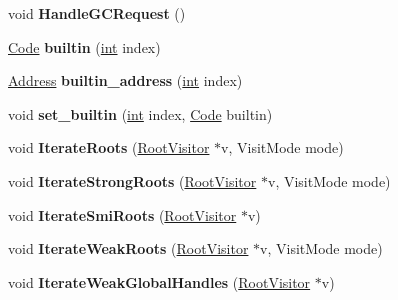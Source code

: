 \begin{DoxyCompactItemize}
void {\bfseries Handle\+G\+C\+Request} ()
\item 
\mbox{\label{classv8_1_1internal_1_1Heap_a3164020f77bdc8f56577bdccc19cf290}} 
\mbox{\hyperlink{classv8_1_1internal_1_1Code}{Code}} {\bfseries builtin} (\mbox{\hyperlink{classint}{int}} index)
\item 
\mbox{\label{classv8_1_1internal_1_1Heap_af899be456bb8c2a296ca880daed45613}} 
\mbox{\hyperlink{classuintptr__t}{Address}} {\bfseries builtin\+\_\+address} (\mbox{\hyperlink{classint}{int}} index)
\item 
\mbox{\label{classv8_1_1internal_1_1Heap_ab7fe0ff7d984fbdf6926e436f858cff0}} 
void {\bfseries set\+\_\+builtin} (\mbox{\hyperlink{classint}{int}} index, \mbox{\hyperlink{classv8_1_1internal_1_1Code}{Code}} builtin)
\item 
\mbox{\label{classv8_1_1internal_1_1Heap_aedea6de613a6a881f4eb8814e883aa90}} 
void {\bfseries Iterate\+Roots} (\mbox{\hyperlink{classv8_1_1internal_1_1RootVisitor}{Root\+Visitor}} $\ast$v, Visit\+Mode mode)
\item 
\mbox{\label{classv8_1_1internal_1_1Heap_a07cc9206480d6994e41902769e78f619}} 
void {\bfseries Iterate\+Strong\+Roots} (\mbox{\hyperlink{classv8_1_1internal_1_1RootVisitor}{Root\+Visitor}} $\ast$v, Visit\+Mode mode)
\item 
\mbox{\label{classv8_1_1internal_1_1Heap_a7cf83754b01dbf26820590c36b311d2a}} 
void {\bfseries Iterate\+Smi\+Roots} (\mbox{\hyperlink{classv8_1_1internal_1_1RootVisitor}{Root\+Visitor}} $\ast$v)
\item 
\mbox{\label{classv8_1_1internal_1_1Heap_a1a3b617b35b3f5db6632b60827c002f2}} 
void {\bfseries Iterate\+Weak\+Roots} (\mbox{\hyperlink{classv8_1_1internal_1_1RootVisitor}{Root\+Visitor}} $\ast$v, Visit\+Mode mode)
\item 
\mbox{\label{classv8_1_1internal_1_1Heap_aab3b04af5baef6bb6f9dec5c5e851fd5}} 
void {\bfseries Iterate\+Weak\+Global\+Handles} (\mbox{\hyperlink{classv8_1_1internal_1_1RootVisitor}{Root\+Visitor}} $\ast$v)

\end{DoxyCompactItemize}
